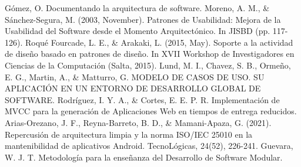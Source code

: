 \documentclass[conference]{IEEEtran}
\begin{document}
\begin{thebibliography}{99}
 Gómez, O. Documentando la arquitectura de software.
 Moreno, A. M., \& Sánchez-Segura, M. (2003, November). Patrones de Usabilidad: Mejora de la Usabilidad del Software desde el Momento Arquitectónico. In JISBD (pp. 117-126).
 Roqué Fourcade, L. E., \& Arakaki, L. (2015, May). Soporte a la actividad de diseño basado en patrones de diseño. In XVII Workshop de Investigadores en Ciencias de la Computación (Salta, 2015).
 Lund, M. I., Chavez, S. B., Ormeño, E. G., Martin, A., \& Matturro, G. MODELO DE CASOS DE USO. SU APLICACIÓN EN UN ENTORNO DE DESARROLLO GLOBAL DE SOFTWARE.
 Rodríguez, I. Y. A., \& Cortes, E. E. P. R. Implementación de MVCC para la generación de Aplicaciones Web en tiempos de entrega reducidos.
 Arias-Orezano, J. F., Reyna-Barreto, B. D., \& Mamani-Apaza, G. (2021). Repercusión de arquitectura limpia y la norma ISO/IEC 25010 en la mantenibilidad de aplicativos Android. TecnoLógicas, 24(52), 226-241.
 Guevara, W. J. T. Metodología para la enseñanza del Desarrollo de Software Modular.
\end{thebibliography}
\end{document}

